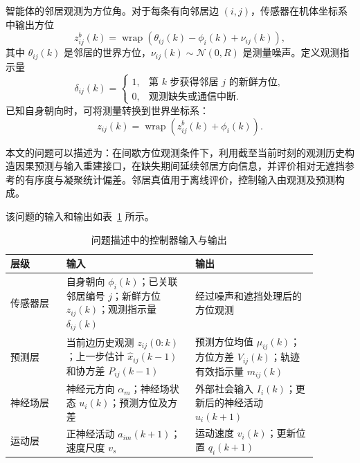 \documentclass[UTF8,fontset=windows,11pt]{ctexart}
\begin{document}
智能体的邻居观测为方位角。对于每条有向邻居边 $(i,j)$，传感器在机体坐标系中输出方位
\begin{equation}
 z^b_{ij}(k)=
 \operatorname{wrap}\left(\theta_{ij}(k)-\phi_i(k)+\nu_{ij}(k)\right),
\end{equation}
其中 $\theta_{ij}(k)$ 是邻居的世界方位，$\nu_{ij}(k)\sim\mathcal N(0,R)$ 是测量噪声。定义观测指示量
\begin{equation}
 \delta_{ij}(k)=
 \begin{cases}
 1, & \text{第 $k$ 步获得邻居 $j$ 的新鲜方位},\\
 0, & \text{观测缺失或通信中断}.
 \end{cases}
\end{equation}
已知自身朝向时，可将测量转换到世界坐标系：
\begin{equation}
 z_{ij}(k)=\operatorname{wrap}(z^b_{ij}(k)+\phi_i(k)).
\end{equation}

本文的问题可以描述为：在间歇方位观测条件下，利用截至当前时刻的观测历史构造因果预测与输入重建接口，在缺失期间延续邻居方向信息，并评价相对无遮挡参考的有序度与凝聚统计偏差。邻居真值用于离线评价，控制输入由观测及预测构成。

该问题的输入和输出如表~\ref{tab:problem_io} 所示。

\begin{table}[H]
 \centering
 \small
 \caption{问题描述中的控制器输入与输出}
 \label{tab:problem_io}
 \begin{tabular}{>{\raggedright\arraybackslash}p{0.16\linewidth}
                 >{\raggedright\arraybackslash}p{0.37\linewidth}
                 >{\raggedright\arraybackslash}p{0.35\linewidth}}
 \toprule
 层级 & 输入 & 输出\\
 \midrule
 传感器层 &
 自身朝向 $\phi_i(k)$；已关联邻居编号 $j$；新鲜方位 $z_{ij}(k)$；观测指示量 $\delta_{ij}(k)$ &
 经过噪声和遮挡处理后的方位观测\\
 预测层 &
 当前边历史观测 $z_{ij}(0:k)$；上一步估计 $\hat x_{ij}(k-1)$ 和协方差 $P_{ij}(k-1)$ &
 预测方位均值 $\mu_{ij}(k)$；方位方差 $V_{ij}(k)$；轨迹有效指示量 $m_{ij}(k)$\\
 神经场层 &
 神经元方向 $\alpha_m$；神经场状态 $u_i(k)$；预测方位及方差 &
 外部社会输入 $I_i(k)$；更新后的神经活动 $u_i(k+1)$\\
 运动层 &
 正神经活动 $a_{im}(k+1)$；速度尺度 $v_s$ &
 运动速度 $v_i(k)$；更新位置 $q_i(k+1)$\\
 \bottomrule
 \end{tabular}
\end{table}
\end{document}
